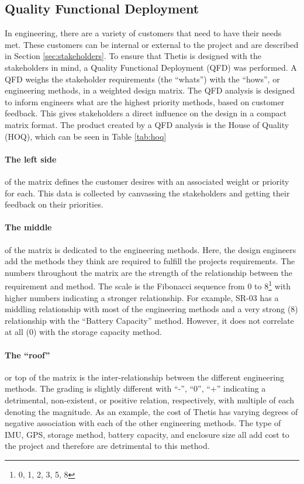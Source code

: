 \begin{landscape}
\end{landscape}

\subsection{Quality Functional Deployment} 
In engineering, there are a variety of customers that need to have their needs met.
These customers can be internal or external to the project and are described in Section \ref{sec:stakeholders}.
To ensure that Thetis is designed with the stakeholders in mind, a Quality Functional Deployment (QFD) was performed.
A QFD weighs the stakeholder requirements (the ``whats'') with the ``hows'', or engineering methods, in a weighted design matrix.
The QFD analysis is designed to inform engineers what are the highest priority methods, based on customer feedback.
This gives stakeholders a direct influence on the design in a compact matrix format.
The product created by a QFD analysis is the House of Quality (HOQ), which can be seen in Table \ref{tab:hoq}

\paragraph*{The left side} of the matrix defines the customer desires with an associated weight or priority for each.
This data is collected by canvassing the stakeholders and getting their feedback on their priorities.

\paragraph*{The middle} of the matrix is dedicated to the engineering methods.
Here, the design engineers add the methods they think are required to fulfill the projects requirements.
The numbers throughout the matrix are the strength of the relationship between the requirement and method. 
The scale is the Fibonacci sequence from 0 to 8\footnote{0, 1, 2, 3, 5, 8} with higher numbers indicating a stronger relationship.
For example, SR-03 has a middling relationship with most of the engineering methods and a very strong (8) relationship with the ``Battery Capacity'' method.
However, it does not correlate at all (0) with the storage capacity method.

\paragraph*{The ``roof''} or top of the matrix is the inter-relationship between the different engineering methods.
The grading is slightly different with ``-'', ``0'', ``+'' indicating a detrimental, non-existent, or positive relation, respectively, with multiple of each denoting the magnitude.
As an example, the cost of Thetis has varying degrees of negative association with each of the other engineering methods.
The type of IMU, GPS, storage method, battery capacity, and enclosure size all add cost to the project and therefore are detrimental to this method.

